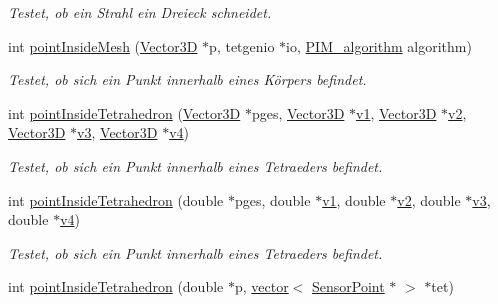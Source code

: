 \begin{DoxyCompactItemize}
\begin{DoxyCompactList}\small\item\em Testet, ob ein Strahl ein Dreieck schneidet. \end{DoxyCompactList}\item 
int \hyperlink{namespaceUtils_af8fc5d6dab27f759ab5d76757a53023f}{point\-Inside\-Mesh} (\hyperlink{classVector3D}{Vector3\-D} $\ast$p, tetgenio $\ast$io, \hyperlink{namespaceUtils_ad369b0127cabda0d6871ce1ae7e6c862}{P\-I\-M\-\_\-algorithm} algorithm)
\begin{DoxyCompactList}\small\item\em Testet, ob sich ein Punkt innerhalb eines Körpers befindet. \end{DoxyCompactList}\item 
int \hyperlink{namespaceUtils_a9b995a1220a78be108b19bda4b776332}{point\-Inside\-Tetrahedron} (\hyperlink{classVector3D}{Vector3\-D} $\ast$pges, \hyperlink{classVector3D}{Vector3\-D} $\ast$\hyperlink{particle__sim_2ParticleSystem_8h_a8d89db3c6515289b4df99467371c544f}{v1}, \hyperlink{classVector3D}{Vector3\-D} $\ast$\hyperlink{particle__sim_2ParticleSystem_8h_aadda57ca88b1f7b495ff17bc402bb584}{v2}, \hyperlink{classVector3D}{Vector3\-D} $\ast$\hyperlink{particle__sim_2ParticleSystem_8h_ac3e04ab93bb7f4e1e62ac7311bf75293}{v3}, \hyperlink{classVector3D}{Vector3\-D} $\ast$\hyperlink{particle__sim_2ParticleSystem_8h_a601d75fa74098fd47a857d5afddb6830}{v4})
\begin{DoxyCompactList}\small\item\em Testet, ob sich ein Punkt innerhalb eines Tetraeders befindet. \end{DoxyCompactList}\item 
int \hyperlink{namespaceUtils_a8f7379e1915d2a04907eb9d99d0a56ad}{point\-Inside\-Tetrahedron} (double $\ast$pges, double $\ast$\hyperlink{particle__sim_2ParticleSystem_8h_a8d89db3c6515289b4df99467371c544f}{v1}, double $\ast$\hyperlink{particle__sim_2ParticleSystem_8h_aadda57ca88b1f7b495ff17bc402bb584}{v2}, double $\ast$\hyperlink{particle__sim_2ParticleSystem_8h_ac3e04ab93bb7f4e1e62ac7311bf75293}{v3}, double $\ast$\hyperlink{particle__sim_2ParticleSystem_8h_a601d75fa74098fd47a857d5afddb6830}{v4})
\begin{DoxyCompactList}\small\item\em Testet, ob sich ein Punkt innerhalb eines Tetraeders befindet. \end{DoxyCompactList}\item 
int \hyperlink{namespaceUtils_a40eaef4d22da849a5deb2f1153d88bbc}{point\-Inside\-Tetrahedron} (double $\ast$p, \hyperlink{classstd_1_1vector}{vector}$<$ \hyperlink{structUtils_1_1SensorPoint}{Sensor\-Point} $\ast$ $>$ $\ast$tet)

\end{DoxyCompactItemize}

